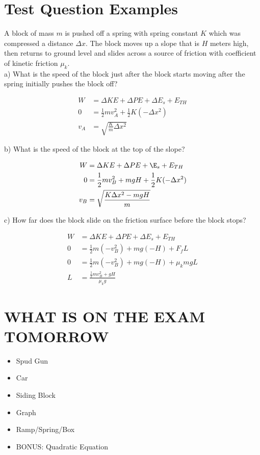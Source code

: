 \documentclass{package/notes}
\begin{document}
\section{Test Question Examples}

\begin{problem}
    A block of mass $m$ is pushed off a spring with spring constant $K$ which was compressed a distance $\Delta x$. The block moves up a slope that is $H$ meters high, then returns to ground level and slides across a source of friction with coefficient of kinetic friction $\mu_k$. \\
    
    a) What is the speed of the block just after the block starts moving after the spring initially pushes the block off?
    
    $$
    \begin{aligned}
        W &= \Delta KE + \Delta PE + \Delta E_s + E_{TH}\\
        0 &= \frac{1}{2}mv_A^2 + \frac{1}{2}K(-\Delta x^2)\\
        v_A &= \sqrt{\frac{K}{m}\Delta x^2}
    \end{aligned}
    $$
    
    b) What is the speed of the block at the top of the slope?
    
    $$
    \begin{aligned}
        W &= \Delta KE + \Delta PE + \E_s + E_{TH}\\
        0 &= \frac{1}{2}mv_B^2+mgH + \frac{1}{2}K(-\Delta x^2)\\
        v_B &= \sqrt{\frac{K\Delta x^2 - mgH}{m}}
    \end{aligned}
    $$
    
    c) How far does the block slide on the friction surface before the block stops?
    
    $$
    \begin{aligned}
        W &= \Delta KE + \Delta PE + \Delta E_s + E_{TH}\\
        0 &= \frac{1}{2}m(-v_B^2) + mg(-H) + F_fL\\
        0 &= \frac{1}{2}m(-v_B^2) + mg(-H) + \mu_kmgL\\
        L &= \frac{\frac{1}{2}mv_B^2+gH}{\mu_kg}
    \end{aligned}
    $$
\end{problem}

\section{WHAT IS ON THE EXAM TOMORROW}

\begin{itemize}
    \item Spud Gun
    \item Car
    \item Siding Block
    \item Graph
    \item Ramp/Spring/Box
    \item BONUS: Quadratic Equation
\end{itemize}
\end{document}
